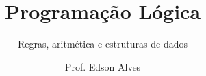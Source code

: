 \title{Programação Lógica}
\subtitle{Regras, aritmética e estruturas de dados}
\date{}
\author{Prof. Edson Alves}
